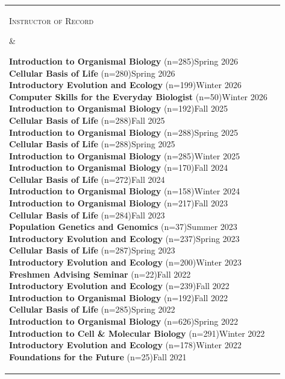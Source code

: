 \documentclass[]{article}
\begin{document}
\begin{tabular}{l | l}
\parbox{0.28\textwidth}{
\begin{center}
\textsc{Instructor of Record}
\end{center}
}
&
\parbox{0.62\textwidth}{

\renewcommand{\baselinestretch}{1.1}\normalsize

\textbf{Introduction to Organismal Biology} (n=285)\hfill Spring 2026\\
\textbf{Cellular Basis of Life} (n=280)\hfill Spring 2026\\
\textbf{Introductory Evolution and Ecology} (n=199)\hfill Winter 2026\\
\textbf{Computer Skills for the Everyday Biologist} (n=50)\hfill Winter 2026\\
\textbf{Introduction to Organismal Biology} (n=192)\hfill Fall 2025\\
\textbf{Cellular Basis of Life} (n=288)\hfill Fall 2025\\
\textbf{Introduction to Organismal Biology} (n=288)\hfill Spring 2025\\
\textbf{Cellular Basis of Life} (n=288)\hfill Spring 2025\\
\textbf{Introduction to Organismal Biology} (n=285)\hfill Winter 2025\\
\textbf{Introduction to Organismal Biology} (n=170)\hfill Fall 2024\\
\textbf{Cellular Basis of Life} (n=272)\hfill Fall 2024\\
\textbf{Introduction to Organismal Biology} (n=158)\hfill Winter 2024\\
\textbf{Introduction to Organismal Biology} (n=217)\hfill Fall 2023\\
\textbf{Cellular Basis of Life} (n=284)\hfill Fall 2023\\
\textbf{Population Genetics and Genomics} (n=37)\hfill Summer 2023\\
\textbf{Introductory Evolution and Ecology} (n=237)\hfill Spring 2023\\
\textbf{Cellular Basis of Life} (n=287)\hfill Spring 2023\\
\textbf{Introductory Evolution and Ecology} (n=200)\hfill Winter 2023\\
\textbf{Freshmen Advising Seminar} (n=22)\hfill Fall 2022\\
\textbf{Introductory Evolution and Ecology} (n=239)\hfill Fall 2022\\
\textbf{Introduction to Organismal Biology} (n=192)\hfill Fall 2022\\
\textbf{Cellular Basis of Life} (n=285)\hfill Spring 2022\\
\textbf{Introduction to Organismal Biology} (n=626)\hfill Spring 2022\\
\textbf{Introduction to Cell \& Molecular Biology} (n=291)\hfill Winter 2022\\
\textbf{Introductory Evolution and Ecology} (n=178)\hfill Winter 2022\\
\textbf{Foundations for the Future} (n=25)\hfill Fall 2021}

\renewcommand{\baselinestretch}{1}\normalsize


\end{tabular} 
\end{document}
